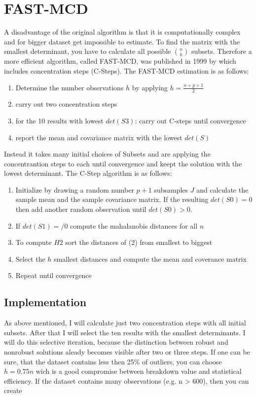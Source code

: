 \section*{FAST-MCD}
A disadvantage of the original algorithm is that it is computationally complex and for bigger dataset get impossible to estimate.
To find the matrix with the smallest determinant, you have to calculate all possible $\binom{n}{h}$ subsets.  
Therefore a more efficient algorithm, called FAST-MCD, was published in 1999 by \citet{rousseeuw1999fast} which includes concentration steps (C-Steps).
The FAST-MCD estimation is as follows:  

\begin{enumerate}
    \item Determine the number observations $h$ by applying $h = \frac{n+p+1}{2}$
    \item carry out two concentration steps
    \item for the 10 results with lowest $det(S3)$: carry out C-steps until convergence
    \item report the mean and covariance matrix with the lowest $det(S)$
\end{enumerate}
 
Instead it takes many initial choices of Subsets and are applying the concentrantion steps to each until convergence and keept the solution with the lowest determinant.
The C-Step algorithm is as follows:

\begin{enumerate}
    \item Initialize by drawing a random number $p+1$ subsamples $J$ and calculate the sample mean and the sample covariance matrix. If the resulting $det(S0)=0$ then add another random observation until $det(S0)>0$.
    \item If $det(S1)=/0$ compute the mahalanobis distances for all $n$
    \item To compute $H2$ sort the distances of (2) from smallest to biggest
    \item Select the $h$ smallest distances and compute the mean and coverance matrix
    \item Repeat until convergence
\end{enumerate}
\citep[p.214]{rousseeuw1999fast}


\subsection*{Implementation}
As above mentioned, I will calculate just two concentration steps with all initial subsets.
After that I will select the ten results with the smallest determinants.
I will do this selective iteration, because the distinction between robust and nonrobust solutions aleady becomes visible after two or three steps.  
If one can be sure, that the dataset contains less then 25\% of outliers, you can choose $h=0.75n$ wich is a good compromise between breakdown value and statistical efficiency.
If the dataset contains many observations (e.g. n > 600), then you can create


